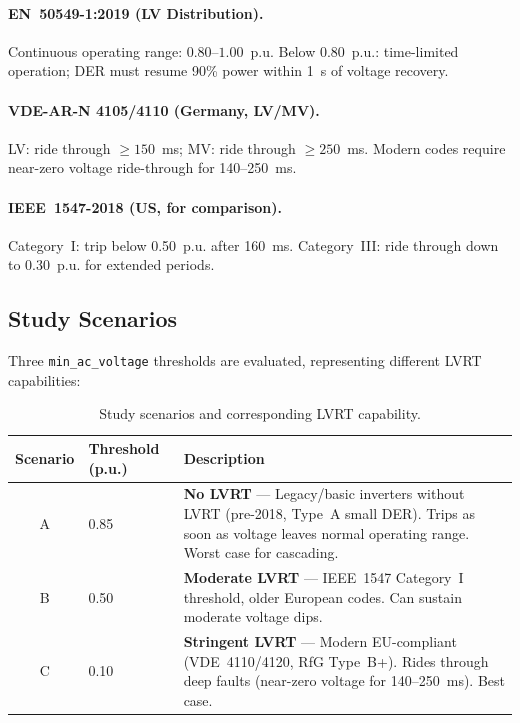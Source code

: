 \paragraph{EN~50549-1:2019 (LV Distribution).}
Continuous operating range: $0.80$--$1.00$~p.u. Below $0.80$~p.u.: time-limited operation; DER must resume 90\% power within 1~s of voltage recovery.

\paragraph{VDE-AR-N 4105/4110 (Germany, LV/MV).}
LV: ride through $\geq 150$~ms; MV: ride through $\geq 250$~ms. Modern codes require near-zero voltage ride-through for 140--250~ms.

\paragraph{IEEE~1547-2018 (US, for comparison).}
Category~I: trip below 0.50~p.u. after 160~ms. Category~III: ride through down to 0.30~p.u. for extended periods.


\subsection{Study Scenarios}
\label{sec:scenarios}

Three \texttt{min\_ac\_voltage} thresholds are evaluated, representing different LVRT capabilities:

\begin{table}[htbp]
    \centering
    \caption{Study scenarios and corresponding LVRT capability.}
    \label{tab:scenarios}
    \begin{tabular}{clp{8.5cm}}
        \toprule
        \textbf{Scenario} & \textbf{Threshold (p.u.)} & \textbf{Description} \\
        \midrule
        A & 0.85 & \textbf{No LVRT} --- Legacy/basic inverters without LVRT (pre-2018, Type~A small DER). Trips as soon as voltage leaves normal operating range. Worst case for cascading. \\
        B & 0.50 & \textbf{Moderate LVRT} --- IEEE~1547 Category~I threshold, older European codes. Can sustain moderate voltage dips. \\
        C & 0.10 & \textbf{Stringent LVRT} --- Modern EU-compliant (VDE~4110/4120, RfG Type~B+). Rides through deep faults (near-zero voltage for 140--250~ms). Best case. \\
        \bottomrule
    \end{tabular}
\end{table}



